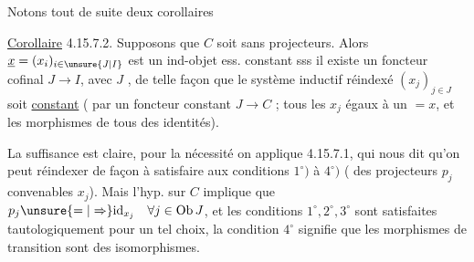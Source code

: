 
Notons tout de suite deux corollaires

\uline{Corollaire} 4.15.7.2. Supposons que $C$ soit sans projecteurs. Alors $\underline{x}=(x_i)_{i\in \unsure{J|I}}$ est un ind-objet ess. constant sss il existe un foncteur cofinal $J\longrightarrow I$, avec $J$  , de telle façon que le système inductif réindexé $(x_j)_{j\in J}$ soit  \uline{constant} ( par un foncteur constant $J\longrightarrow C$ ; tous les $x_j$ égaux à un $=x$, et les morphismes de  tous des identités).


La suffisance est claire, pour la nécessité on applique 4.15.7.1, qui nous dit qu'on peut réindexer de façon à satisfaire aux conditions $1^\circ)$ à $4^\circ)$ ( des projecteurs $p_j$ convenables  $x_j$). Mais l'hyp. sur $C$ implique que  $p_j \unsure{=|\Rightarrow}\mathrm{id}_{x_j}\quad\forall j\in\mathrm{Ob}\,J$, et les conditions $1^\circ,2^\circ,3^\circ$ sont satisfaites tautologiquement pour un tel choix, la condition $4^\circ$ signifie que les morphismes de transition sont des isomorphismes.


